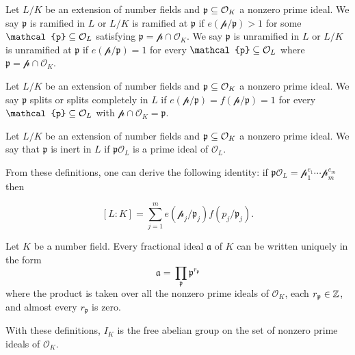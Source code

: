 \begin{definition}
    Let $L/K$ be an extension of number fields and $\mathfrak{p} \subseteq \mathcal{O}_{K}$ a nonzero prime ideal. We say $\mathfrak{p}$ is ramified in $L$ or $L/K$ is ramified at $\mathfrak{p}$ if $e(\mathcal{p}/\mathfrak{p}) > 1$ for some $\mathcal{p} \sq \mathcal{O}_{L}$ satisfying $\mathfrak{p} = \mathcal{p}\cap \mathcal{O}_{K}$. We say $\mathfrak{p}$ is unramified in $L$ or $L/K$ is unramified at $\mathfrak{p}$ if $e(\mathcal{p}/\mathfrak{p}) =1$ for every $\mathcal{p} \sq \mathcal{O}_{L}$ where $\mathfrak{p} = \mathcal{p}\cap \mathcal{O}_{K}$.
\end{definition}

\begin{definition}
    Let $L/K$ be an extension of number fields and $\mathfrak{p} \subseteq \mathcal{O}_{K}$ a nonzero prime ideal. We say $\mathfrak{p}$ splits or splits completely in $L$ if $e(\mathcal{p}/\mathfrak{p}) = f(\mathcal{p}/\mathfrak{p}) = 1$ for every $\mathcal{p} \sq \mathcal{O}_{L}$ with $\mathcal{p} \cap \mathcal{O}_{K} = \mathfrak{p}$.
\end{definition}

\begin{definition}
    Let $L/K$ be an extension of number fields and $\mathfrak{p} \subseteq \mathcal{O}_{K}$ a nonzero prime ideal. We say that $\mathfrak{p}$ is inert in $L$ if $\mathfrak{p}\mathcal{O}_{L}$ is a prime ideal of $\mathcal{O}_{L}$.
\end{definition}

From these definitions, one can derive the following identity: if $\mathfrak{p} \mathcal{O}_{L} = \mathcal{p}_1^{e_1}\cdots \mathcal{p}_m^{e_m}$ then 

    \[[L:K] = \sum_{j=1}^m e(\mathcal{p}_j/\mathfrak{p}_j)f(\mathit{p}_j/\mathfrak{p}_j).\]


\begin{proposition}
    Let $K$ be a number field. Every fractional ideal $\mathfrak{a}$ of $K$ can be written uniquely in the form 
        \[\mathfrak{a} = \prod_{\mathfrak{p}} \mathfrak{p}^{r_\mathfrak{p}}\]
    where the product is taken over all the nonzero prime ideals of $\mathcal{O}_{K}$, each $r_\mathfrak{p} \in \mathbb{Z}$, and almost every $r_\mathfrak{p}$ is zero.
\end{proposition}

\begin{remark}
    With these definitions, $I_K$ is the free abelian group on the set of nonzero prime ideals of $\mathcal{O}_{K}$.
\end{remark}


